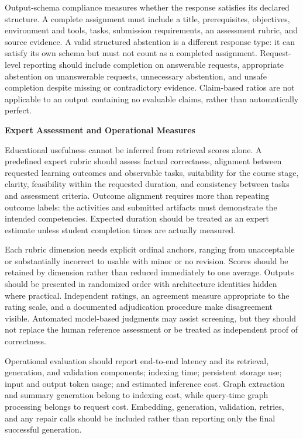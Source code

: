 \documentclass[12pt,a4paper]{report}
\numberwithin{equation}{chapter}
\begin{document}
Output-schema compliance measures whether the response satisfies its declared structure. A complete assignment must include a title, prerequisites, objectives, environment and tools, tasks, submission requirements, an assessment rubric, and source evidence. A valid structured abstention is a different response type: it can satisfy its own schema but must not count as a completed assignment. Request-level reporting should include completion on answerable requests, appropriate abstention on unanswerable requests, unnecessary abstention, and unsafe completion despite missing or contradictory evidence. Claim-based ratios are not applicable to an output containing no evaluable claims, rather than automatically perfect.

\par\medskip
\textbf{Expert Assessment and Operational Measures}

Educational usefulness cannot be inferred from retrieval scores alone. A predefined expert rubric should assess factual correctness, alignment between requested learning outcomes and observable tasks, suitability for the course stage, clarity, feasibility within the requested duration, and consistency between tasks and assessment criteria. Outcome alignment requires more than repeating outcome labels: the activities and submitted artifacts must demonstrate the intended competencies. Expected duration should be treated as an expert estimate unless student completion times are actually measured.

Each rubric dimension needs explicit ordinal anchors, ranging from unacceptable or substantially incorrect to usable with minor or no revision. Scores should be retained by dimension rather than reduced immediately to one average. Outputs should be presented in randomized order with architecture identities hidden where practical. Independent ratings, an agreement measure appropriate to the rating scale, and a documented adjudication procedure make disagreement visible. Automated model-based judgments may assist screening, but they should not replace the human reference assessment or be treated as independent proof of correctness.

Operational evaluation should report end-to-end latency and its retrieval, generation, and validation components; indexing time; persistent storage use; input and output token usage; and estimated inference cost. Graph extraction and summary generation belong to indexing cost, while query-time graph processing belongs to request cost. Embedding, generation, validation, retries, and any repair calls should be included rather than reporting only the final successful generation.
\end{document}
